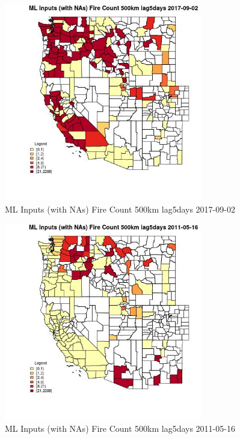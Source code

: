 \clearpage 

\begin{figure} 
\centering  
\includegraphics[width=0.77\textwidth]{Code_Outputs/Report_ML_input_PM25_Step4_part_e_de_duplicated_aves_compiled_2019-05-21wNAs_CountyFire_Count_500km_lag5daysMean2017-09-02.jpg} 
\caption{\label{fig:Report_ML_input_PM25_Step4_part_e_de_duplicated_aves_compiled_2019-05-21wNAsCountyFire_Count_500km_lag5daysMean2017-09-02}ML Inputs (with NAs) Fire Count 500km lag5days 2017-09-02} 
\end{figure} 
 

\begin{figure} 
\centering  
\includegraphics[width=0.77\textwidth]{Code_Outputs/Report_ML_input_PM25_Step4_part_e_de_duplicated_aves_compiled_2019-05-21wNAs_CountyFire_Count_500km_lag5daysMean2011-05-16.jpg} 
\caption{\label{fig:Report_ML_input_PM25_Step4_part_e_de_duplicated_aves_compiled_2019-05-21wNAsCountyFire_Count_500km_lag5daysMean2011-05-16}ML Inputs (with NAs) Fire Count 500km lag5days 2011-05-16} 
\end{figure} 
 

